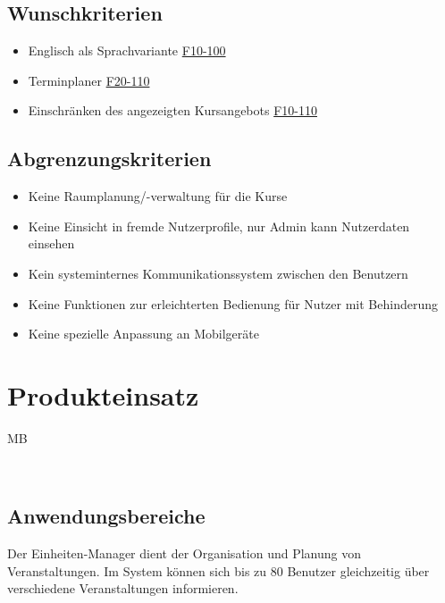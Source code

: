 \documentclass[a4paper]{scrreprt}
\begin{document}
    \section{Wunschkriterien}
			\begin{itemize}
				\item Englisch als Sprachvariante \hyperlink{spracheAendern}{F10-100}
				\item Terminplaner \hyperlink{terminplaner}{F20-110}
	     		\item Einschränken des angezeigten Kursangebots \hyperlink{kursEinschraenken}{F10-110}
			\end{itemize}
			
	\section{Abgrenzungskriterien}
     		\begin{itemize}
	     		\item Keine Raumplanung/-verwaltung für die Kurse
	     		\item Keine Einsicht in fremde Nutzerprofile, nur Admin kann Nutzerdaten einsehen
	     		\item Kein systeminternes Kommunikationssystem zwischen den Benutzern
	     		\item Keine Funktionen zur erleichterten Bedienung für Nutzer mit Behinderung
	     		\item Keine spezielle Anpassung an Mobilgeräte
     		\end{itemize}
        
  
\chapter{Produkteinsatz}
	\begin{tiny}
		MB
	\end{tiny}\\

    \section{Anwendungsbereiche}
		 Der \gls{Einheiten}-Manager dient der Organisation und Planung von Veranstaltungen. Im System können sich bis zu 80 Benutzer gleichzeitig über verschiedene Veranstaltungen informieren.   
     
\end{document}
